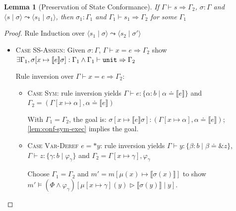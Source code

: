 \documentclass[twoside, english]{sdqthesis}
\newcommand{\tuple}[2]{\langle #1 \mid #2 \rangle}
\newcommand{\bbracket}[1]{\llbracket #1 \rrbracket}
\newcommand{\tr}[0]{\triangleright}
\newtheorem{lemma}[theorem]{Lemma}
\theoremstyle{definition}
\begin{document}
\begin{lemma}[Preservation of State Conformance]
  If $\Gamma \vdash s \Rightarrow \Gamma_2$, $\sigma : \Gamma$ and $\tuple{s}{\sigma} \leadsto \tuple{s_1}{\sigma_1}$, then  $\sigma_1 : \Gamma_1$ and $\Gamma_1 \vdash s_1 \Rightarrow \Gamma_2$ for some $\Gamma_1$
\end{lemma}
\begin{proof} Rule Induction over $\tuple{s_1}{\sigma} \leadsto \tuple{s_2}{\sigma'}$
\begin{itemize}
  \item \textsc{Case SS-Assign}:
    Given $\sigma : \Gamma$, $\Gamma \vdash x = e \Rightarrow \Gamma_2$
    show $\exists \Gamma_1, \sigma[ x \mapsto \llbracket e \rrbracket \sigma] : \Gamma_1 \wedge \Gamma_1 \vdash \code{unit} \Rightarrow \Gamma_2 $

    Rule inversion over $\Gamma \vdash x = e \Rightarrow \Gamma_2$:
    \begin{itemize}
      \item \textsc{Case Sym}: rule inversion yields $\Gamma \vdash e: \{ \alpha : b \mid \alpha \doteq \llbracket e \rrbracket \}$ and $\Gamma_2 = (\Gamma[x \mapsto \alpha], \alpha \doteq \llbracket e \rrbracket)$

      With $\Gamma_1 = \Gamma_2$, the goal is: $\sigma[x \mapsto \bbracket{e}\sigma ] : (\Gamma[x \mapsto \alpha], \alpha \doteq \llbracket e \rrbracket)$; \cref{lem:conf-sym-exec} implies the goal.
      \item \textsc{Case Var-Deref} $e = *y$:
        rule inversion yields $\Gamma \vdash y : \{\beta : b \mid \beta \doteq \&z\}$, $\Gamma \vdash z : \{\gamma : b \mid \varphi_\gamma\}$ and $\Gamma_2 = \Gamma[x \mapsto \gamma], \varphi_\gamma$

        Choose $\Gamma_1 = \Gamma_2$ and $ m' = m[\mu(x) \mapsto \bbracket{\sigma(x)}] $ to show 
        $ m' \vDash (\Phi \wedge \varphi_\gamma)[\mu[x \mapsto \gamma](y) \tr \bbracket{\sigma(y)} \mid y]$.


\end{itemize}
\end{itemize}
\end{proof}
\end{document}
